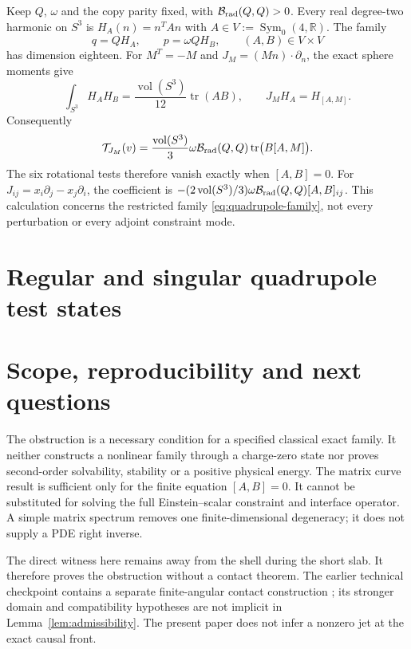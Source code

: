 \documentclass[11pt]{article}
\theoremstyle{remark}
\newcommand{\tr}{\operatorname{tr}}
\newcommand{\Sym}{\operatorname{Sym}}
\newcommand{\R}{\mathbb R}
\begin{document}
Keep $Q$, $\omega$ and the copy parity fixed, with
$\mathcal B_{\rm rad}(Q,Q)>0$. Every real degree-two harmonic on $S^3$
is $H_A(n)=n^TAn$ with $A\in V:=\Sym_0(4,\R)$. The family
\begin{equation}
 q=QH_A,\qquad p=\omega QH_B,\qquad (A,B)\in V\times V
 \label{eq:quadrupole-family}
\end{equation}
has dimension eighteen. For $M^T=-M$ and $J_M=(Mn)\cdot\partial_n$,
the exact sphere moments give
\begin{equation}
 \int_{S^3}H_AH_B=\frac{\operatorname{vol}(S^3)}{12}\tr(AB),
 \qquad J_MH_A=H_{[A,M]}.
 \label{eq:sphere-moments}
\end{equation}
Consequently
\begin{equation}
 \mathcal T_{J_M}(v)=
 \frac{\operatorname{vol}(S^3)}{3}\omega
 \mathcal B_{\rm rad}(Q,Q)\tr\bigl(B[A,M]\bigr).
 \label{eq:matrix-charge}
\end{equation}
The six rotational tests therefore vanish exactly when $[A,B]=0$.
For $J_{ij}=x_i\partial_j-x_j\partial_i$, the coefficient is
$-(2\operatorname{vol}(S^3)/3)\omega\mathcal B_{\rm rad}(Q,Q)[A,B]_{ij}$.
This calculation concerns the restricted family
\eqref{eq:quadrupole-family}, not every perturbation or every adjoint
constraint mode.

\section{Regular and singular quadrupole test states}
\label{sec:geometry}


\section{Scope, reproducibility and next questions}

The obstruction is a necessary condition for a specified classical exact
family. It neither constructs a nonlinear family through a charge-zero
state nor proves second-order solvability, stability or a positive physical
energy. The matrix curve result is sufficient only for the finite equation
$[A,B]=0$. It cannot be substituted for solving the full Einstein--scalar
constraint and interface operator. A simple matrix spectrum removes one
finite-dimensional degeneracy; it does not supply a PDE right inverse.

The direct witness here remains away from the shell during the short slab.
It therefore proves the obstruction without a contact theorem. The earlier
technical checkpoint contains a separate finite-angular contact construction
\cite{MaldonadoShell2026}; its stronger domain and compatibility hypotheses
are not implicit in Lemma~\ref{lem:admissibility}. The present paper does not
infer a nonzero jet at the exact causal front.
\end{document}

